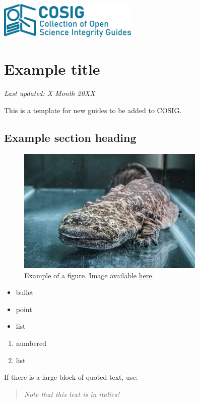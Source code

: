 \documentclass[letterpaper, 12pt]{article}
\begin{document}
\flushleft
\includegraphics[width=0.5\textwidth]{img/home/241017_final_logo_mockup.png}

\section*{Example title}
\textit{Last updated: X Month 20XX}

This is a template for new guides to be added to COSIG.

\subsection*{Example section heading}

\begin{figure}[h!tbp]
    \centering
    \includegraphics[width=0.8\textwidth]{img/home/chinese_giant_salamander.jpg}
    \caption*{Example of a figure. Image available \href{https://commons.wikimedia.org/wiki/File:Velemlok_\%C4\%8D\%C3\%ADnsk\%C3\%BD_zoo_praha_1.jpg}{here}.}
\end{figure}

\begin{itemize}
    \setlength\itemsep{-0.5em}
    \item bullet
    \item point
    \item list
\end{itemize}

\begin{enumerate}
    \setlength\itemsep{-0.5em}
    \item numbered
    \item list
\end{enumerate}

\pagebreak

If there is a large block of quoted text, use:

\begin{quote}
    \textit{Note that this text is in italics!}
\end{quote}
\end{document}

